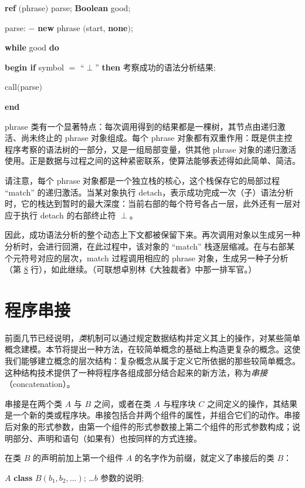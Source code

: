 \documentclass[twoside,11pt,fontset=none]{ctexbook}
\begin{document}
\quad \textbf{ref} $($phrase$)$ parse; \textbf{Boolean} good;

\quad parse: $-$ \textbf{new} phrase $($start, \textbf{none}$)$;

\quad \textbf{while} good \textbf{do}

\quad \textbf{begin if} symbol $=$ ``$\perp$'' \textbf{then} 考察成功的语法分析结果;

\quad \quad call$($parse$)$

\quad \textbf{end}

phrase 类有一个显著特点：每次调用得到的结果都是一棵树，其节点由递归激活、尚未终止的 phrase 对象组成。每个 phrase 对象都有双重作用：既是供主控程序考察的语法树的一部分，又是一组局部变量，供其他 phrase 对象的递归激活使用。正是数据与过程之间的这种紧密联系，使算法能够表述得如此简单、简洁。

请注意，每个 phrase 对象都是一个独立栈的核心，这个栈保存它的局部过程 ``match'' 的递归激活。当某对象执行 detach，表示成功完成一次（子）语法分析时，它的栈达到暂时的最大深度：当前右部的每个符号各占一层，此外还有一层对应于执行 detach 的右部终止符 $\perp$。

因此，成功语法分析的整个动态上下文都被保留下来。再次调用对象以生成另一种分析时，会进行回溯，在此过程中，该对象的 ``match'' 栈逐层缩减。在与右部某个元符号对应的层次，match 过程调用相应的 phrase 对象，生成另一种子分析（第 \hyperref[en:comment-label-8]{8} 行），如此继续。（可联想卓别林《大独裁者》中那一排军官。）

\section{程序串接}

前面几节已经说明，\textit{类}机制可以通过规定数据结构并定义其上的操作，对某些简单概念建模。本节将提出一种方法，在较简单概念的基础上构造更复杂的概念。这使我们能够建立概念的层次结构：复杂概念从属于定义它所依据的那些较简单概念。这种结构技术提供了一种将程序各组成部分结合起来的新方法，称为\textit{串接}（concatenation）。

串接是在两个类 $A$ 与 $B$ 之间，或者在类 $A$ 与程序块 $C$ 之间定义的操作，其结果是一个新的类或程序块。串接包括合并两个组件的属性，并组合它们的动作。串接后对象的形式参数，由第一个组件的形式参数接上第二个组件的形式参数构成；说明部分、声明和语句（如果有）也按同样的方式连接。

在类 $B$ 的声明前加上第一个组件 $A$ 的名字作为前缀，就定义了串接后的类 $B$：

\quad $A$ \textbf{class} $B(b_1, b_2, \dots)$; \dots $b$ 参数的说明;
\end{document}
